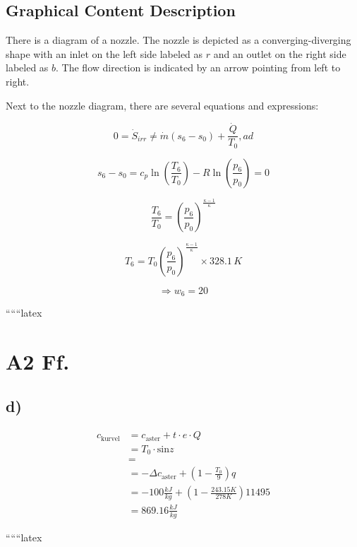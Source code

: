 \subsection*{Graphical Content Description}

There is a diagram of a nozzle. The nozzle is depicted as a converging-diverging shape with an inlet on the left side labeled as $r$ and an outlet on the right side labeled as $b$. The flow direction is indicated by an arrow pointing from left to right.

Next to the nozzle diagram, there are several equations and expressions:

\[
0 = \dot{S}_{irr} \neq \dot{m} (s_6 - s_0) + \frac{\dot{Q}}{T_0}, ad
\]

\[
s_6 - s_0 = c_p \ln \left( \frac{T_6}{T_0} \right) - R \ln \left( \frac{p_6}{p_0} \right) = 0
\]

\[
\frac{T_6}{T_0} = \left( \frac{p_6}{p_0} \right)^{\frac{\kappa - 1}{\kappa}}
\]

\[
T_6 = T_0 \left( \frac{p_6}{p_0} \right)^{\frac{\kappa - 1}{\kappa}} \times 328.1 \, K
\]

\[
\Rightarrow w_6 = 20
\]

``````latex

\section*{A2 Ff.}

\subsection*{d)}

\begin{align*}
c_{\text{kurvel}} &= c_{\text{aster}} + t \cdot e \cdot Q \\
&= T_0 \cdot \text{sin} z \\
&= \\
&= -\Delta c_{\text{aster}} + \left( 1 - \frac{T_0}{9} \right) q \\
&= -100 \frac{kJ}{kg} + \left( 1 - \frac{243.15 K}{278 K} \right) 11495 \\
&= 869.16 \frac{kJ}{kg}
\end{align*}

``````latex



